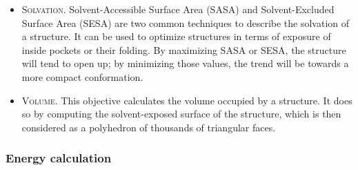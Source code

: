 \begin{itemize}
	\item \textsc{Solvation}. Solvent-Accessible Surface Area (SASA) and Solvent-Excluded Surface Area (SESA) are two common techniques to describe the solvation of a structure. It can be used to optimize structures in terms of exposure of inside pockets or their folding. By maximizing SASA or SESA, the structure will tend to open up; by minimizing those values, the trend will be towards a more compact conformation.

	\item \textsc{Volume}. This objective calculates the volume occupied by a structure. It does so by computing the solvent-exposed surface of the structure, which is then considered as a polyhedron of thousands of triangular faces.


\end{itemize}\subsubsection{Energy calculation}
